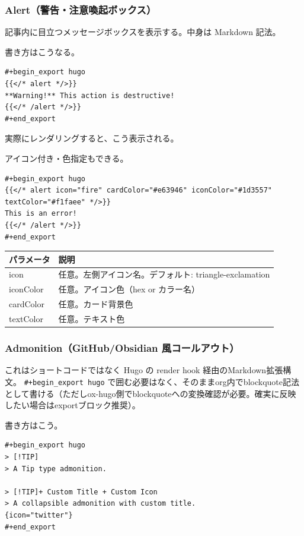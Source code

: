 \documentclass[11pt]{article}
\begin{document}
\subsubsection{Alert（警告・注意喚起ボックス）}
\label{sec:orga7f6a7a}

記事内に目立つメッセージボックスを表示する。中身は Markdown 記法。

書き方はこうなる。

\begin{verbatim}
#+begin_export hugo
{{</* alert */>}}
**Warning!** This action is destructive!
{{</* /alert */>}}
#+end_export
\end{verbatim}

実際にレンダリングすると、こう表示される。

アイコン付き・色指定もできる。

\begin{verbatim}
#+begin_export hugo
{{</* alert icon="fire" cardColor="#e63946" iconColor="#1d3557" textColor="#f1faee" */>}}
This is an error!
{{</* /alert */>}}
#+end_export
\end{verbatim}

\begin{center}
\begin{tabular}{ll}
パラメータ & 説明\\
\hline
icon & 任意。左側アイコン名。デフォルト: triangle-exclamation\\
iconColor & 任意。アイコン色（hex or カラー名）\\
cardColor & 任意。カード背景色\\
textColor & 任意。テキスト色\\
\end{tabular}
\end{center}
\subsubsection{Admonition（GitHub/Obsidian 風コールアウト）}
\label{sec:org7cf7b74}

これはショートコードではなく Hugo の render hook 経由のMarkdown拡張構文。 \texttt{\#+begin\_export hugo} で囲む必要はなく、そのままorg内でblockquote記法として書ける（ただしox-hugo側でblockquoteへの変換確認が必要。確実に反映したい場合はexportブロック推奨）。

書き方はこう。

\begin{verbatim}
#+begin_export hugo
> [!TIP]
> A Tip type admonition.

> [!TIP]+ Custom Title + Custom Icon
> A collapsible admonition with custom title.
{icon="twitter"}
#+end_export
\end{verbatim}
\end{document}
